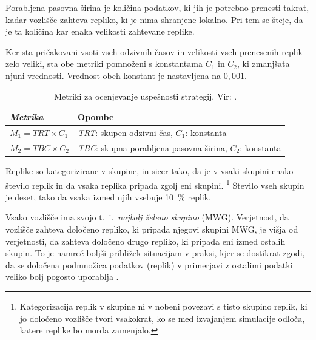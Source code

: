 \documentclass[a4paper, 12pt]{book}
\begin{document}
Porabljena pasovna širina je količina podatkov, ki jih je potrebno prenesti
takrat, kadar vozlišče zahteva repliko, ki je nima shranjene lokalno. Pri
tem se šteje, da je ta količina kar enaka velikosti zahtevane replike.

Ker sta pričakovani vsoti vseh odzivnih časov in velikosti vseh prenesenih
replik zelo veliki, sta obe metriki pomnoženi s konstantama $C_1$ in $C_2$,
ki zmanjšata njuni vrednosti. Vrednost obeh konstant je nastavljena na
$0,001$.


\begin{table}
\small
  \begin{center}
    \begin{tabulary}{1.0\textwidth}{ >{\itshape}p{9em} J}
      \textnormal{Metrika} & Opombe \\
      \hline
      $M_1 = \mathit{TRT} \times C_1$ &
        \textit{TRT}: skupen odzivni čas, $C_1$: konstanta \\
      $M_2 = \mathit{TBC} \times C_2$ &
        \textit{TBC}: skupna porabljena pasovna širina, $C_2$: konstanta
    \end{tabulary}
  \end{center}

  \caption{Metriki za ocenjevanje uspešnosti strategij.
    Vir: \cite{efs2011,mfs2012}.}
  \label{tbl:sim_metrics}
\end{table}


Replike so kategorizirane v skupine, in sicer tako, da je v vsaki skupini
enako število replik in da vsaka replika pripada zgolj eni skupini.%
\footnote{Kategorizacija replik v skupine ni v nobeni povezavi s tisto skupino
replik, ki jo določeno vozlišče tvori vsakokrat, ko se med izvajanjem
simulacije odloča, katere replike bo morda zamenjalo.}
Število vseh skupin je deset, tako da vsaka izmed njih vsebuje 10~\% replik.

Vsako vozlišče ima svojo t.~i.~\textit{najbolj želeno skupino} (MWG).
Verjetnost, da vozlišče zahteva določeno repliko, ki pripada njegovi skupini
MWG, je višja od verjetnosti, da zahteva določeno drugo repliko, ki pripada
eni izmed ostalih skupin. To je namreč boljši približek situacijam v praksi,
kjer se dostikrat zgodi, da se določena podmnožica podatkov (replik) v
primerjavi z ostalimi podatki veliko bolj pogosto uporablja
\cite{efs2011, mfs2012}.
\end{document}
